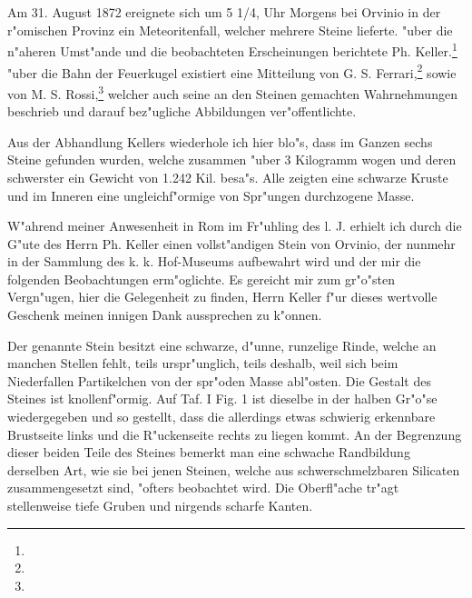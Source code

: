 \documentclass[a4paper, 11pt, oneside]{article}
\begin{document}
\section{}
\paragraph{}
Am 31. August 1872 ereignete sich um 5 1/4, Uhr Morgens bei Orvinio in der r"omischen Provinz ein Meteoritenfall, welcher mehrere Steine lieferte. "uber die n"aheren Umst"ande und die beobachteten Erscheinungen berichtete Ph. Keller.\footnote{} "uber die Bahn der Feuerkugel existiert eine Mitteilung von G. S. Ferrari,\footnote{} sowie von M. S. Rossi,\footnote{} welcher auch seine an den Steinen gemachten Wahrnehmungen beschrieb und darauf bez"ugliche Abbildungen ver"offentlichte.

Aus der Abhandlung Kellers wiederhole ich hier blo"s, dass im Ganzen sechs Steine gefunden wurden, welche zusammen "uber 3 Kilogramm wogen und deren schwerster ein Gewicht von 1.242 Kil. besa"s. Alle zeigten eine schwarze Kruste und im Inneren eine ungleichf"ormige von Spr"ungen durchzogene Masse.

W"ahrend meiner Anwesenheit in Rom im Fr"uhling des l. J. erhielt ich durch die G"ute des Herrn Ph. Keller einen vollst"andigen Stein von Orvinio, der nunmehr in der Sammlung des k. k. Hof-Museums aufbewahrt wird und der mir die folgenden Beobachtungen erm"oglichte. Es gereicht mir zum gr"o"sten Vergn"ugen, hier die Gelegenheit zu finden, Herrn Keller f"ur dieses wertvolle Geschenk meinen innigen Dank aussprechen zu k"onnen.

Der genannte Stein besitzt eine schwarze, d"unne, runzelige Rinde, welche an manchen Stellen fehlt, teils urspr"unglich, teils deshalb, weil sich beim Niederfallen Partikelchen von der spr"oden Masse abl"osten. Die Gestalt des Steines ist knollenf"ormig. Auf Taf. I Fig. 1 ist dieselbe in der halben Gr"o"se wiedergegeben und so gestellt, dass die allerdings etwas schwierig erkennbare Brustseite links und die R"uckenseite rechts zu liegen kommt. An der Begrenzung dieser beiden Teile des Steines bemerkt man eine schwache Randbildung derselben Art, wie sie bei jenen Steinen, welche aus schwerschmelzbaren Silicaten zusammengesetzt sind, "ofters beobachtet wird. Die Oberfl"ache tr"agt stellenweise tiefe Gruben und nirgends scharfe Kanten.
\end{document}
